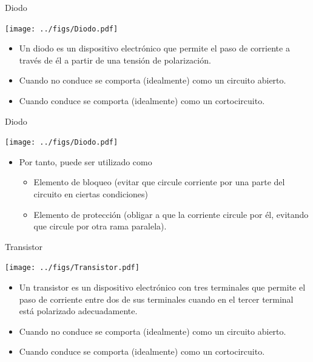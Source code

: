 \documentclass[xcolor={usenames,svgnames,dvipsnames}]{beamer}
\begin{document}
\begin{frame}[label={sec:org429fbf6}]{Diodo}
\begin{center}
\texttt{[image: ../figs/Diodo.pdf]}
\end{center}

\begin{itemize}
\item Un diodo es un dispositivo electrónico que permite el paso de
corriente a través de él a partir de una tensión de polarización.

\item Cuando \alert{no conduce} se comporta (idealmente) como un \alert{circuito abierto}.

\item Cuando \alert{conduce} se comporta (idealmente) como un \alert{cortocircuito}.
\end{itemize}
\end{frame}

\begin{frame}[label={sec:org34a4c97}]{Diodo}
\begin{center}
\texttt{[image: ../figs/Diodo.pdf]}
\end{center}

\begin{itemize}
\item Por tanto, puede ser utilizado como

\begin{itemize}
\item \alert{Elemento de bloqueo} (evitar que circule corriente por una parte
del circuito en ciertas condiciones)

\item \alert{Elemento de protección} (obligar a que la corriente circule por
él, evitando que circule por otra rama paralela).
\end{itemize}
\end{itemize}
\end{frame}

\begin{frame}[label={sec:orgd86efd7}]{Transistor}
\begin{center}
\texttt{[image: ../figs/Transistor.pdf]}
\end{center}

\begin{itemize}
\item Un transistor es un dispositivo electrónico con tres terminales que
permite el paso de corriente entre dos de sus terminales cuando en el
tercer terminal está polarizado adecuadamente.

\item Cuando \alert{no conduce} se comporta (idealmente) como un \alert{circuito abierto}.

\item Cuando \alert{conduce} se comporta (idealmente) como un \alert{cortocircuito}.
\end{itemize}
\end{frame}
\end{document}
